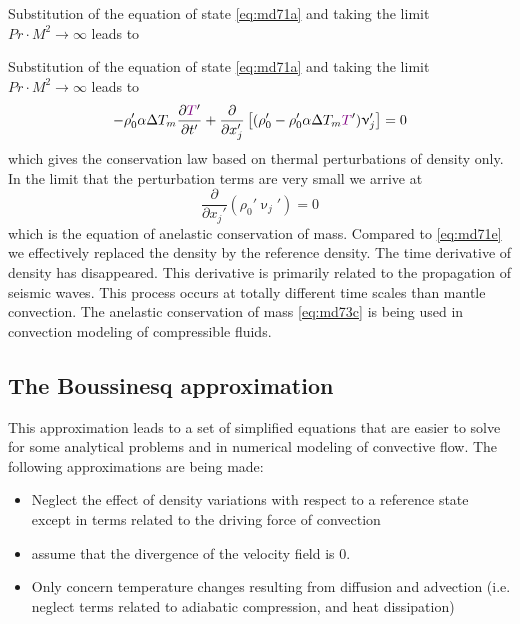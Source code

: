 Substitution of the equation of state \eqref{eq:md71a} and taking the limit $Pr\cdot M^2 \rightarrow\infty$
leads to





Substitution of the equation of state \eqref{eq:md71a} 
and taking the limit $Pr \cdot M^2 \rightarrow \infty$ leads to
\begin{equation}
-\rho_0' \alpha \Delta T_m \frac{\partial {\color{violet} T}'  }{\partial t'} + 
\frac{\partial }{\partial x_j'} 
\left[
(\rho_0' - \rho_0' \alpha \Delta T_m {\color{violet} T}') \upnu_j'
\right] = 0
\label{eq:md73b}
\end{equation}
which gives the conservation law based on thermal perturbations of density only. In the
limit that the perturbation terms are very small we arrive at
\begin{equation}
\frac{\partial }{\partial x_j'} ( \rho_0' \upnu_j' ) =0
\label{eq:md73c}
\end{equation}
which is the equation of anelastic conservation of mass. Compared to \eqref{eq:md71e} we
effectively replaced the density by the reference density. The time derivative of density
has disappeared. This derivative is primarily related to the propagation of seismic waves.
This process occurs at totally different time scales than mantle convection. The anelastic
conservation of mass \eqref{eq:md73c} is being used in convection modeling of compressible fluids.


\subsection{The Boussinesq approximation}

This approximation leads to a set of simplified equations that are easier to solve for some
analytical problems and in numerical modeling of convective flow. The following
approximations are being made:
\begin{itemize}
\item Neglect the effect of density variations with respect to a reference state except in terms
related to the driving force of convection
\item assume that the divergence of the velocity field is 0.
\item Only concern temperature changes resulting from diffusion and advection (i.e. neglect
terms related to adiabatic compression, and heat dissipation)
\end{itemize}

